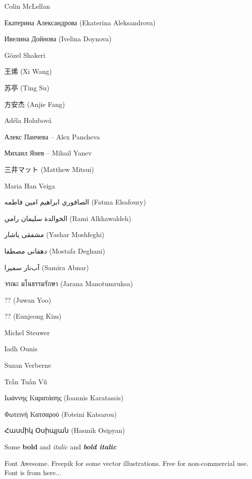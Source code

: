 
\begin{preamble}
{}

Colin McLellan

Екатерина Александрова (Ekaterina Aleksandrova)

Ивелина Дойнова (Ivelina Doynova)

G\"{o}zel Shakeri

王烯 (Xi Wang)

苏亭 (Ting Su)

方安杰 (Anjie Fang)

Ad\'{e}la Holubov\'{a}

Алекс Панчева -- Alex Pancheva

Михаил Янев -- Mihail Yanev

三井マット (Matthew Mitsui)

Maria Han Veiga

{\arabicfont الصافوري ابراهيم امين فاطمه} (Fatma Elsafoury)

{\arabicfont  الخوالدة سليمان رامي} (Rami Alkhawaldeh)

{\farsifont مشفقى ياشار} (Yashar Moshfeghi)

{\farsifont دهقانی مصطفا} (Mostafa Deghani)

{\farsifont آب‌نار سمیرا} (Samira Abnar)

{\thaifont จรณะ มโนธรรมรักษา} (Jarana Manotumruksa)

?? (Juwan Yoo)

?? (Eunjeong Kim)

Michel Steuwer

Iadh Ounis

Suzan Verberne


Trần Tuấn Vũ

Ιωάννης Καρατάσης (Ioannis Karatassis)

Φωτεινή Κατσαρού (Foteini Katsarou)

{\armenianfont Հասմիկ Օսիպյան} (Hasmik Osipyan)

Some \textbf{bold} and \emph{italic} and \textbf{\emph{bold italic}}



\todo{========}
 
Font Awesome. Freepik for some vector illustrations. Free for non-commercial use. Font is from here...


\end{preamble}
